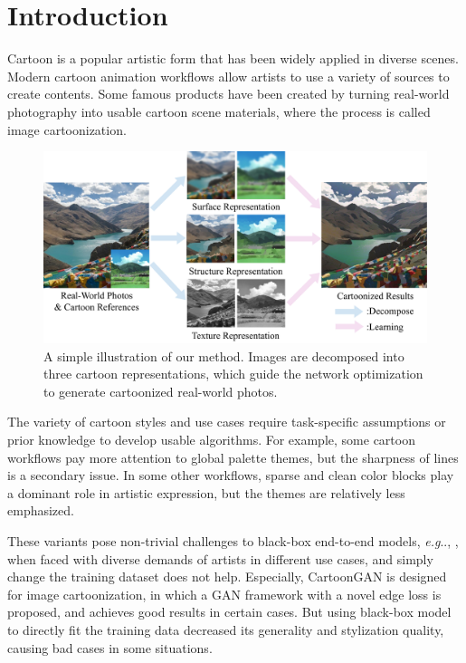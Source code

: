 \documentclass[10pt,twocolumn,letterpaper]{article}
\makeatletter
\DeclareRobustCommand\onedot{\futurelet\@let@token\@onedot}
\def\@onedot{\ifx\@let@token.\else.\null\fi\xspace}
\def\eg{\emph{e.g}\onedot}
\makeatother
\begin{document}
\section{Introduction}
Cartoon is a popular artistic form that has been widely applied in diverse scenes. Modern cartoon animation workflows allow artists to use a variety of sources to create contents. Some famous products have been created by turning real-world photography into usable cartoon scene materials, where the process is called image cartoonization.
\begin{figure}[t]
\centering
\includegraphics[width=\linewidth]{imgs/figure1}
\caption{A simple illustration of our method. Images are decomposed into three cartoon representations, which guide the network optimization to generate cartoonized real-world photos.}
\label{fig:shinjuku}
\vspace{-1em}
\end{figure}

The variety of cartoon styles and use cases require task-specific assumptions or prior knowledge to develop usable algorithms. For example, some cartoon workflows pay more attention to global palette themes, but the sharpness of lines is a secondary issue. In some other workflows, sparse and clean color blocks play a dominant role in artistic expression, but the themes are relatively less emphasized. 

These variants pose non-trivial challenges to black-box end-to-end models, \eg, \cite{johnson2016perceptual, CycleGAN2017, chen2018cartoongan}, when faced with diverse demands of artists in different use cases, and simply change the training dataset does not help. Especially, CartoonGAN \cite{chen2018cartoongan} is designed for image cartoonization, in which a GAN framework with a novel edge loss is proposed, and achieves good results in certain cases. But using black-box model to directly fit the training data decreased its generality and stylization quality, causing bad cases in some situations. 
\end{document}
